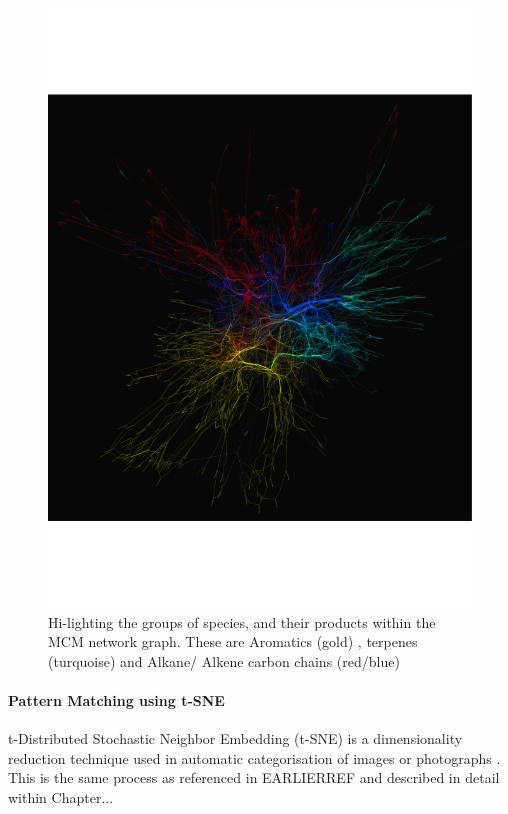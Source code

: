     \begin{figure}[H]
         \centering
    \includegraphics[width=\textwidth,trim={0 4cm 0 4cm},angle=-90]{figures_c1/beijingtest/graphgroups.pdf}
     \caption{Hi-lighting the groups of species, and their products within the MCM network graph. These are {\color{DarkGoldenrod} Aromatics (gold)} , {\color{DarkTurquoise} terpenes (turquoise) } and {\color{OrangeRed} Alkane}/{\color{RoyalBlue} Alkene  } carbon chains (red/blue)}
     \label{fig:colour}
     \end{figure}

\paragraph{Pattern Matching using t-SNE}
t-Distributed Stochastic Neighbor Embedding (t-SNE) is a dimensionality reduction technique used in automatic categorisation of images or photographs \citep{truthandbeauty,sketchy}. This is the same process as referenced in EARLIERREF and described in detail within Chapter... 

